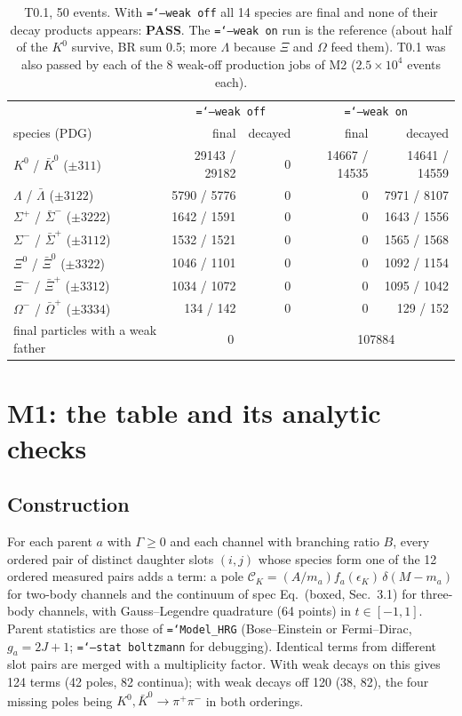 \documentclass[11pt,a4paper]{article}
\newcommand{\CK}{\mathcal C_K}
\newcommand{\pass}{\textcolor{green!45!black}{\textbf{PASS}}}
\newcommand{\code}[1]{\texttt{\hyphenchar\font=`\-#1}}
\begin{document}
\begin{table}[h]
\centering\small
\begin{tabular}{lrrrr}
\toprule
& \multicolumn{2}{c}{\code{--weak off}} & \multicolumn{2}{c}{\code{--weak on}} \\
species (PDG) & final & decayed & final & decayed \\
\midrule
$K^0$ / $\bar K^0$ ($\pm311$)            & 29143 / 29182 & 0 & 14667 / 14535 & 14641 / 14559 \\
$\Lambda$ / $\bar\Lambda$ ($\pm3122$)    & 5790 / 5776   & 0 & 0 & 7971 / 8107 \\
$\Sigma^+$ / $\bar\Sigma^-$ ($\pm3222$)  & 1642 / 1591   & 0 & 0 & 1643 / 1556 \\
$\Sigma^-$ / $\bar\Sigma^+$ ($\pm3112$)  & 1532 / 1521   & 0 & 0 & 1565 / 1568 \\
$\Xi^0$ / $\bar\Xi^0$ ($\pm3322$)        & 1046 / 1101   & 0 & 0 & 1092 / 1154 \\
$\Xi^-$ / $\bar\Xi^+$ ($\pm3312$)        & 1034 / 1072   & 0 & 0 & 1095 / 1042 \\
$\Omega^-$ / $\bar\Omega^+$ ($\pm3334$)  & 134 / 142     & 0 & 0 & 129 / 152 \\
\midrule
final particles with a weak father & \multicolumn{2}{c}{0} & \multicolumn{2}{c}{107884} \\
\bottomrule
\end{tabular}
\caption{T0.1, 50 events. With \code{--weak off} all 14 species are final and none of their
decay products appears: \pass. The \code{--weak on} run is the reference (about half of the $K^0$
survive, BR sum 0.5; more $\Lambda$ because $\Xi$ and $\Omega$ feed them). T0.1 was also passed by
each of the 8 weak-off production jobs of M2 ($2.5\times10^4$ events each).}
\end{table}

\section{M1: the table and its analytic checks}

\subsection{Construction}
For each parent $a$ with $\Gamma\ge0$ and each channel with branching ratio $B$, every ordered
pair of distinct daughter slots $(i,j)$ whose species form one of the 12 ordered measured pairs
adds a term: a pole $\CK=(A/m_a)f_a(\epsilon_K)\,\delta(M-m_a)$ for two-body channels and the
continuum of spec Eq.~(boxed, Sec.~3.1) for three-body channels, with Gauss--Legendre quadrature
(64 points) in $t\in[-1,1]$. Parent statistics are those of \code{Model\_HRG} (Bose--Einstein or
Fermi--Dirac, $g_a=2J+1$; \code{--stat boltzmann} for debugging). Identical terms from different
slot pairs are merged with a multiplicity factor. With weak decays on this gives 124 terms (42
poles, 82 continua); with weak decays off 120 (38, 82), the four missing poles being
$K^0,\bar K^0\to\pi^+\pi^-$ in both orderings.
\end{document}
